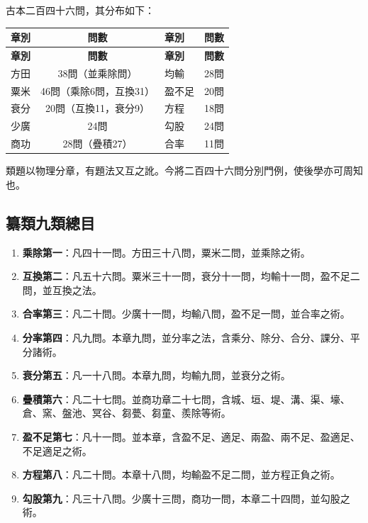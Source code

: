 \documentclass[11pt,a4paper]{article}
\begin{document}
古本二百四十六問，其分布如下：

\begin{center}
\begin{longtable}{|l|c|l|c|}
\hline
\textbf{章別} & \textbf{問數} & \textbf{章別} & \textbf{問數} \\
\hline
\endfirsthead
\hline
\textbf{章別} & \textbf{問數} & \textbf{章別} & \textbf{問數} \\
\hline
\endhead
\hline
\endfoot
方田 & 38問（並乘除問） & 均輸 & 28問 \\
粟米 & 46問（乘除6問，互換31） & 盈不足 & 20問 \\
衰分 & 20問（互換11，衰分9） & 方程 & 18問 \\
少廣 & 24問 & 勾股 & 24問 \\
商功 & 28問（疊積27） & 合率 & 11問 \\
\hline
\end{longtable}
\end{center}

類題以物理分章，有題法又互之訛。今將二百四十六問分別門例，使後學亦可周知也。

\subsection*{纂類九類總目}

\begin{enumerate}[label=\textbf{\arabic*.}]
\item \textbf{乘除第一}：凡四十一問。方田三十八問，粟米二問，並乘除之術。
\item \textbf{互換第二}：凡五十六問。粟米三十一問，衰分十一問，均輸十一問，盈不足二問，並互換之法。
\item \textbf{合率第三}：凡二十問。少廣十一問，均輸八問，盈不足一問，並合率之術。
\item \textbf{分率第四}：凡九問。本章九問，並分率之法，含乘分、除分、合分、課分、平分諸術。
\item \textbf{衰分第五}：凡一十八問。本章九問，均輸九問，並衰分之術。
\item \textbf{疊積第六}：凡二十七問。並商功章二十七問，含城、垣、堤、溝、渠、壕、倉、窯、盤池、冥谷、芻甍、芻童、羨除等術。
\item \textbf{盈不足第七}：凡十一問。並本章，含盈不足、適足、兩盈、兩不足、盈適足、不足適足之術。
\item \textbf{方程第八}：凡二十問。本章十八問，均輸盈不足二問，並方程正負之術。
\item \textbf{勾股第九}：凡三十八問。少廣十三問，商功一問，本章二十四問，並勾股之術。
\end{enumerate}
\end{document}
